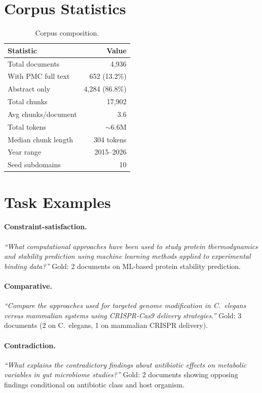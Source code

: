 \documentclass{article}
\begin{document}
\section{Corpus Statistics}
\label{app:corpus}

\begin{table}[h]
\centering
\caption{Corpus composition.}
\small
\begin{tabular}{lr}
\toprule
\textbf{Statistic} & \textbf{Value} \\
\midrule
Total documents & 4,936 \\
With PMC full text & 652 (13.2\%) \\
Abstract only & 4,284 (86.8\%) \\
Total chunks & 17,902 \\
Avg chunks/document & 3.6 \\
Total tokens & ${\sim}$6.6M \\
Median chunk length & 304 tokens \\
Year range & 2015--2026 \\
Seed subdomains & 10 \\
\bottomrule
\end{tabular}
\end{table}

\section{Task Examples}
\label{app:examples}

\paragraph{Constraint-satisfaction.}
\emph{``What computational approaches have been used to study protein thermodynamics and stability prediction using machine learning methods applied to experimental binding data?''}
Gold: 2 documents on ML-based protein stability prediction.

\paragraph{Comparative.}
\emph{``Compare the approaches used for targeted genome modification in C.\ elegans versus mammalian systems using CRISPR-Cas9 delivery strategies.''}
Gold: 3 documents (2 on C.\ elegans, 1 on mammalian CRISPR delivery).

\paragraph{Contradiction.}
\emph{``What explains the contradictory findings about antibiotic effects on metabolic variables in gut microbiome studies?''}
Gold: 2 documents showing opposing findings conditional on antibiotic class and host organism.
\end{document}
